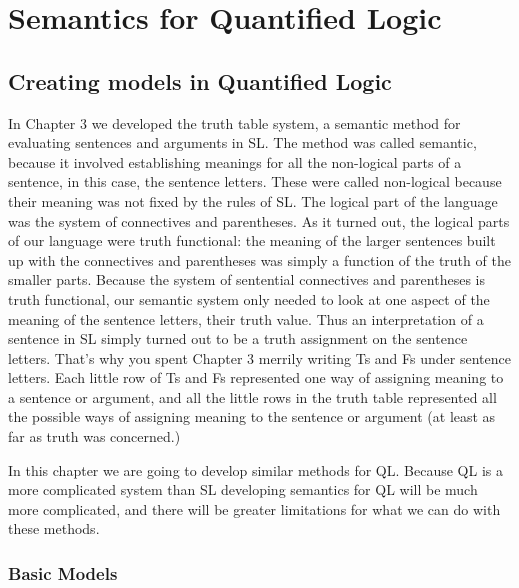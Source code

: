 \chapter{Semantics for Quantified Logic}
\label{chap:semantics_for_ql}
\setlength{\parindent}{1em}



\section{Creating models in Quantified Logic}

In Chapter 3 we developed the truth table system, a semantic method for evaluating sentences and arguments in SL. The method was called semantic, because it involved establishing meanings for all the non-logical parts of a sentence, in this case, the sentence letters. These were called non-logical because their meaning was not fixed by the rules of SL. The logical part of the language was the system of connectives and parentheses. As it turned out, the logical parts of our language were truth functional: the meaning of the larger sentences built up with the connectives and parentheses was simply a function of the truth of the smaller parts. Because the system of sentential connectives and parentheses is truth functional, our semantic system only needed to look at one aspect of the meaning of the sentence letters, their truth value. Thus an interpretation of a sentence in SL simply turned out to be a truth assignment on the sentence letters. That's why you spent Chapter 3 merrily writing Ts and Fs under sentence letters. Each little row of Ts and Fs represented one way of assigning meaning to a sentence or argument, and all the little rows in the truth table represented all the possible ways of assigning meaning to the sentence or argument (at least as far as truth was concerned.) 

In this chapter we are going to develop similar methods for QL. Because QL is a more complicated system than SL developing semantics for QL will be much more complicated, and there will be greater limitations for what we can do with these methods.

\subsection{Basic Models}

